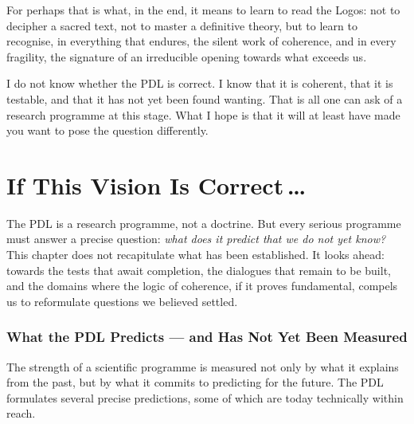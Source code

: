 \documentclass[12pt, a4paper, openright]{book}
\begin{document}
\medskip

For perhaps that is what, in the end, it means to learn to read the Logos: not to decipher a sacred text, not to master a definitive theory, but to learn to recognise, in everything that endures, the silent work of coherence, and in every fragility, the signature of an irreducible opening towards what exceeds us.

\medskip

I do not know whether the PDL is correct. I know that it is coherent, that it is testable, and that it has not yet been found wanting. That is all one can ask of a research programme at this stage. What I hope is that it will at least have made you want to pose the question differently.

\chapter{If This Vision Is Correct\texorpdfstring{\,\ldots}{...}}

The PDL is a research programme, not a doctrine. But every serious programme must answer a precise question: \emph{what does it predict that we do not yet know?} This chapter does not recapitulate what has been established. It looks ahead: towards the tests that await completion, the dialogues that remain to be built, and the domains where the logic of coherence, if it proves fundamental, compels us to reformulate questions we believed settled.

\subsection*{What the PDL Predicts --- and Has Not Yet Been Measured}

The strength of a scientific programme is measured not only by what it explains from the past, but by what it commits to predicting for the future. The PDL formulates several precise predictions, some of which are today technically within reach.

\medskip
\end{document}
